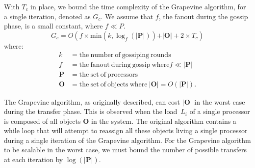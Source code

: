 With $T_c$ in place, we bound the time complexity of the \textsf{Grapevine}
algorithm, for a single iteration, denoted as $G_c$. We assume that $f$, the
fanout during the gossip phase, is a small constant, where $f \ll P$.
\[
G_c = O(f\times \mathrm{min}(k, \log_f(\vert\mathbf{P}\vert)) + \vert\mathbf{O}\vert + 2 \times T_c)
\]
where:
\begin{align*}
 k          & = \mathrm{the\ number\ of\ gossiping\ rounds} \\
 f          & = \mathrm{the\ fanout\ during\ gossip\ where} f \ll \vert\mathbf{P}\vert \\
 \mathbf{P} & = \mathrm{the\ set\ of\ processors} \\
 \mathbf{O} & = \mathrm{the\ set\ of\ objects\ where\ } \vert\mathbf{O}\vert = O(\vert\mathbf{P}\vert).
\end{align*}

%

The \textsf{Grapevine} algorithm, as originally described, can cost
$\vert\mathbf{O}\vert$ in the worst case during the transfer phase. This is
observed when the load~$L_i$ of a single processor is composed of all objects
$\mathbf{O}$ in the system. The original algorithm contains a while loop that
will attempt to reassign all these objects living a single processor during a
single iteration of the \textsf{Grapevine} algorithm. For the
\textsf{Grapevine} algorithm to be scalable in the worst case, we must
bound the number of possible transfers at each iteration by
$\log(\vert\mathbf{P}\vert)$. 
